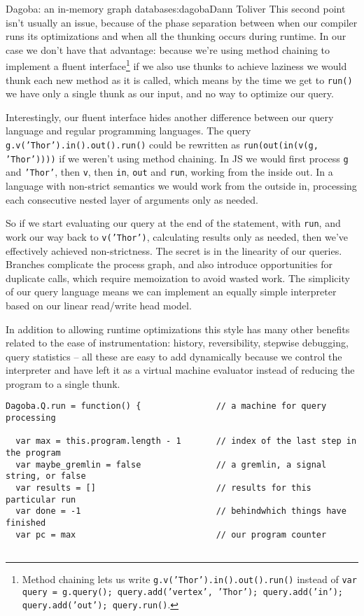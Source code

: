 \begin{aosachapter}{Dagoba: an in-memory graph database}{s:dagoba}{Dann Toliver}
This second point isn't usually an issue, because of the phase
separation between when our compiler runs its optimizations and when all
the thunking occurs during runtime. In our case we don't have that
advantage: because we're using method chaining to implement a fluent
interface\footnote{Method chaining lets us write
  \texttt{g.v('Thor').in().out().run()} instead of
  \texttt{var query = g.query(); query.add('vertex', 'Thor'); query.add('in'); query.add('out'); query.run()}.}
if we also use thunks to achieve laziness we would thunk each new method
as it is called, which means by the time we get to \texttt{run()} we
have only a single thunk as our input, and no way to optimize our query.

Interestingly, our fluent interface hides another difference between our
query language and regular programming languages. The query
\texttt{g.v('Thor').in().out().run()} could be rewritten as
\texttt{run(out(in(v(g, 'Thor'))))} if we weren't using method chaining.
In JS we would first process \texttt{g} and \texttt{'Thor'}, then
\texttt{v}, then \texttt{in}, \texttt{out} and \texttt{run}, working
from the inside out. In a language with non-strict semantics we would
work from the outside in, processing each consecutive nested layer of
arguments only as needed.

So if we start evaluating our query at the end of the statement, with
\texttt{run}, and work our way back to \texttt{v('Thor')}, calculating
results only as needed, then we've effectively achieved non-strictness.
The secret is in the linearity of our queries. Branches complicate the
process graph, and also introduce opportunities for duplicate calls,
which require memoization to avoid wasted work. The simplicity of our
query language means we can implement an equally simple interpreter
based on our linear read/write head model.

In addition to allowing runtime optimizations this style has many other
benefits related to the ease of instrumentation: history, reversibility,
stepwise debugging, query statistics -- all these are easy to add
dynamically because we control the interpreter and have left it as a
virtual machine evaluator instead of reducing the program to a single
thunk.

\label{interpreter-unveiled}

\begin{verbatim}
Dagoba.Q.run = function() {               // a machine for query processing

  var max = this.program.length - 1       // index of the last step in the program
  var maybe_gremlin = false               // a gremlin, a signal string, or false
  var results = []                        // results for this particular run
  var done = -1                           // behindwhich things have finished
  var pc = max                            // our program counter


\end{verbatim}
\end{aosachapter}
